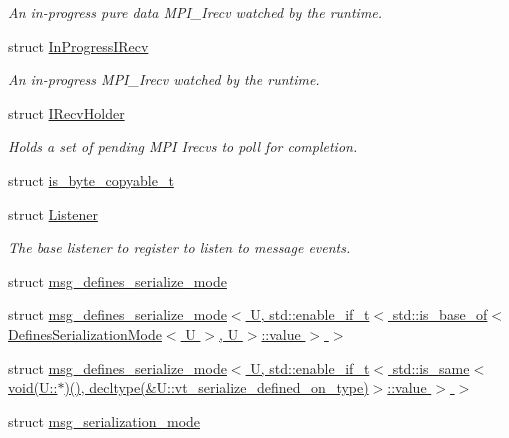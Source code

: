 \begin{DoxyCompactItemize}
\begin{DoxyCompactList}\small\item\em An in-\/progress pure data M\+P\+I\+\_\+\+Irecv watched by the runtime. \end{DoxyCompactList}\item 
struct \hyperlink{structvt_1_1messaging_1_1_in_progress_i_recv}{In\+Progress\+I\+Recv}
\begin{DoxyCompactList}\small\item\em An in-\/progress M\+P\+I\+\_\+\+Irecv watched by the runtime. \end{DoxyCompactList}\item 
struct \hyperlink{structvt_1_1messaging_1_1_i_recv_holder}{I\+Recv\+Holder}
\begin{DoxyCompactList}\small\item\em Holds a set of pending M\+PI Irecvs to poll for completion. \end{DoxyCompactList}\item 
struct \hyperlink{structvt_1_1messaging_1_1is__byte__copyable__t}{is\+\_\+byte\+\_\+copyable\+\_\+t}
\item 
struct \hyperlink{structvt_1_1messaging_1_1_listener}{Listener}
\begin{DoxyCompactList}\small\item\em The base listener to register to listen to message events. \end{DoxyCompactList}\item 
struct \hyperlink{structvt_1_1messaging_1_1msg__defines__serialize__mode}{msg\+\_\+defines\+\_\+serialize\+\_\+mode}
\item 
struct \hyperlink{structvt_1_1messaging_1_1msg__defines__serialize__mode_3_01_u_00_01std_1_1enable__if__t_3_01std_8698c5f7a65cc513c46123d196b4add1}{msg\+\_\+defines\+\_\+serialize\+\_\+mode$<$ U, std\+::enable\+\_\+if\+\_\+t$<$ std\+::is\+\_\+base\+\_\+of$<$ Defines\+Serialization\+Mode$<$ U $>$, U $>$\+::value $>$ $>$}
\item 
struct \hyperlink{structvt_1_1messaging_1_1msg__defines__serialize__mode_3_01_u_00_01std_1_1enable__if__t_3_01std_9ff39ec7a2238fd9d7cc614da26fbe04}{msg\+\_\+defines\+\_\+serialize\+\_\+mode$<$ U, std\+::enable\+\_\+if\+\_\+t$<$ std\+::is\+\_\+same$<$ void(\+U\+::$\ast$)(), decltype(\&\+U\+::vt\+\_\+serialize\+\_\+defined\+\_\+on\+\_\+type)$>$\+::value $>$ $>$}
\item 
struct \hyperlink{structvt_1_1messaging_1_1msg__serialization__mode}{msg\+\_\+serialization\+\_\+mode}
\item 

\end{DoxyCompactItemize}
